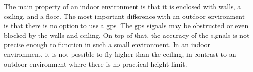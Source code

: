 The main property of an indoor environment is that it is enclosed with walls, a ceiling, and a floor. The most important difference with an outdoor environment is that there is no option to use a \acs{gps}. The \acs{gps} signals may be obstructed or even blocked by the walls and ceiling. On top of that, the accuracy of the signals is not precise enough to function in such a small environment. In an indoor environment, it is not possible to fly higher than the ceiling, in contrast to an outdoor environment where there is no practical height limit.